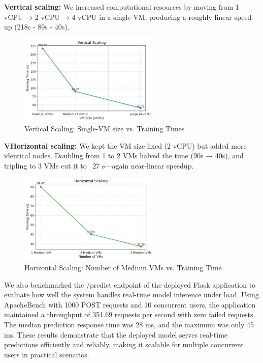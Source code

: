 \documentclass[12pt,a4paper]{article}
\begin{document}
\textbf{Vertical scaling:} We increased computational resources by moving from 1 vCPU → 2 vCPU → 4 vCPU in a single VM, producing a roughly linear speed-up (218s - 89s - 40s).
\begin{figure}[H]
  \centering
  \includegraphics[width=0.6\textwidth]{ver.png}
  \caption{Vertical Scaling: Single-VM size vs. Training Times}
  \label{fig:vertical}
\end{figure}
\textbf{VHorizontal scaling:} We kept the VM size fixed (2 vCPU) but added more identical nodes. Doubling from 1 to 2 VMs halved the time (90s → 40s), and tripling to 3 VMs cut it to ~27 s—again near‐linear speedup.
\begin{figure}[H]
  \centering
  \includegraphics[width=0.6\textwidth]{hori.png}
  \caption{Horizontal Scaling: Number of Medium VMs vs. Training Time}
  \label{fig:horizontal}
\end{figure}
We also benchmarked the /predict endpoint of the deployed Flask application to evaluate how well the system handles real-time model inference under load. Using ApacheBench with 1000 POST requests and 10 concurrent users, the application maintained a throughput of 351.69 requests per second with zero failed requests. The median prediction response time was 28 ms, and the maximum was only 45 ms. These results demonstrate that the deployed model serves real-time predictions efficiently and reliably, making it scalable for multiple concurrent users in practical scenarios.
\end{document}
